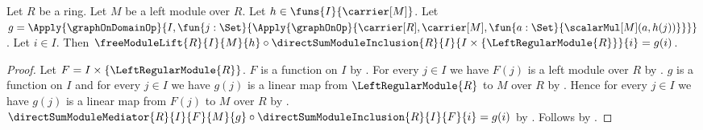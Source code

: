 \begin{theorem}\label{free_module_lift_factorization}
    Let $R$ be a ring.
    Let $M$ be a left module over $R$.
    Let $h\in\funs{I}{\carrier[M]}$.
    Let
        $g=\Apply{\graphOnDomainOp}{
            I,\fun{j:\Set}{
                \Apply{\graphOnOp}{
                    \carrier[R],\carrier[M],
                    \fun{a:\Set}{\scalarMul[M](a,h(j))}}}}$.
    Let $i\in I$.
    Then
        $\freeModuleLift{R}{I}{M}{h}\circ
            \directSumModuleInclusion{R}{I}{
                I\times\{\LeftRegularModule{R}\}}{i}=g(i)$.
\end{theorem}
\begin{proof}
    Let $F=I\times\{\LeftRegularModule{R}\}$.
    $F$ is a function on $I$ by
        .
    For every $j\in I$ we have $F(j)$ is a left module over $R$ by
        .
    $g$ is a function on $I$ and for every $j\in I$ we have
        $g(j)$ is a linear map from $\LeftRegularModule{R}$ to $M$ over $R$ by
        .
    Hence for every $j\in I$ we have $g(j)$ is a linear map from
        $F(j)$ to $M$ over $R$ by
        .
    $\directSumModuleMediator{R}{I}{F}{M}{g}\circ
        \directSumModuleInclusion{R}{I}{F}{i}=g(i)$ by
        .
    Follows by .
\end{proof}

